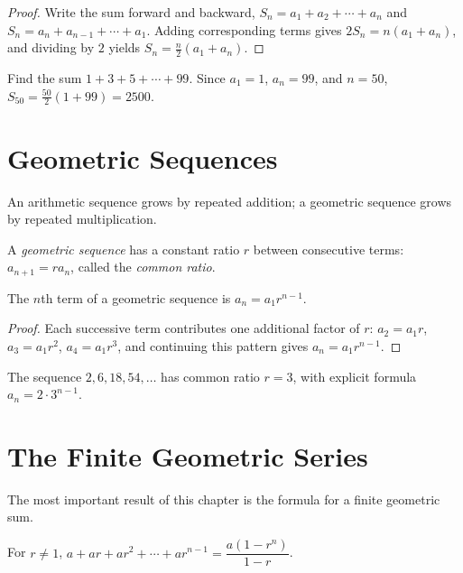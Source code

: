 \begin{proof}
Write the sum forward and backward, $S_n = a_1+a_2+\cdots+a_n$ and $S_n =
a_n+a_{n-1}+\cdots+a_1$. Adding corresponding terms gives $2S_n =
n(a_1+a_n)$, and dividing by $2$ yields $S_n = \tfrac{n}{2}(a_1+a_n)$.
\end{proof}

\begin{example}
Find the sum $1+3+5+\cdots+99$. Since $a_1=1$, $a_n=99$, and $n=50$,
$S_{50} = \tfrac{50}{2}(1+99) = 2500$.
\end{example}

\section{Geometric Sequences}

An arithmetic sequence grows by repeated addition; a geometric sequence
grows by repeated multiplication.

\begin{definition}
A \emph{geometric sequence} has a constant ratio $r$ between consecutive
terms: $a_{n+1} = ra_n$, called the \emph{common ratio}.
\end{definition}

\begin{theorem}
The $n$th term of a geometric sequence is $a_n = a_1r^{n-1}$.
\end{theorem}

\begin{proof}
Each successive term contributes one additional factor of $r$: $a_2 =
a_1r$, $a_3 = a_1r^2$, $a_4 = a_1r^3$, and continuing this pattern gives
$a_n = a_1r^{n-1}$.
\end{proof}

\begin{example}
The sequence $2, 6, 18, 54, \dots$ has common ratio $r=3$, with explicit
formula $a_n = 2\cdot3^{n-1}$.
\end{example}

\section{The Finite Geometric Series}

The most important result of this chapter is the formula for a finite
geometric sum.

\begin{theorem}
For $r \neq 1$, $a+ar+ar^2+\cdots+ar^{n-1} = \dfrac{a(1-r^n)}{1-r}$.
\end{theorem}

